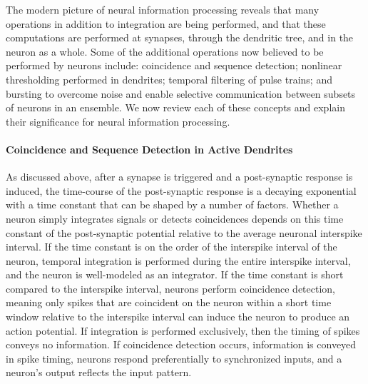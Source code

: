 The modern picture of neural information processing reveals that many operations in addition to integration are being performed, and that these computations are performed at synapses, through the dendritic tree, and in the neuron as a whole. Some of the additional operations now believed to be performed by neurons include: coincidence and sequence detection; nonlinear thresholding performed in dendrites; temporal filtering of pulse trains; and bursting to overcome noise and enable selective communication between subsets of neurons in an ensemble. We now review each of these concepts and explain their significance for neural information processing.

\paragraph{Coincidence and Sequence Detection in Active Dendrites}
As discussed above, after a synapse is triggered and a post-synaptic response is induced, the time-course of the post-synaptic response is a decaying exponential with a time constant that can be shaped by a number of factors. Whether a neuron simply integrates signals or detects coincidences depends on this time constant of the post-synaptic potential relative to the average neuronal interspike interval. If the time constant is on the order of the interspike interval of the neuron, temporal integration is performed during the entire interspike interval, and the neuron is well-modeled as an integrator. If the time constant is short compared to the interspike interval, neurons perform coincidence detection, meaning only spikes that are coincident on the neuron within a short time window relative to the interspike interval can induce the neuron to produce an action potential. If integration is performed exclusively, then the timing of spikes conveys no information. If coincidence detection occurs, information is conveyed in spike timing, neurons respond preferentially to synchronized inputs, and a neuron's output reflects the input pattern.

